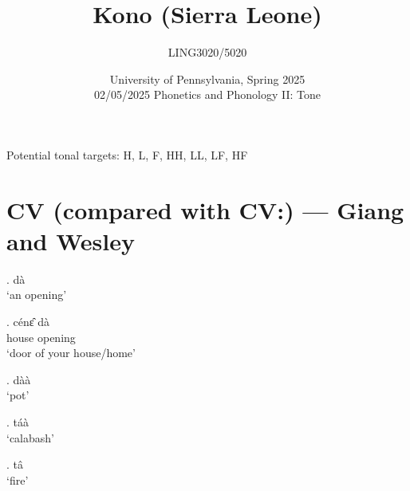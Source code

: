 \documentclass{assets/fieldnotes}
\title{Kono (Sierra Leone)}
\author{LING3020/5020}
\date{University of Pennsylvania, Spring 2025\\02/05/2025 Phonetics and Phonology II: Tone }
\begin{document}
\maketitle
\tableofcontents

\newpage

Potential tonal targets: H, L, F, HH, LL, LF, HF

\section{CV (compared with CV:) --- Giang and Wesley}






\ex. dà\\
`an opening' 

\exg. cénɛ̂ dà\\
house opening\\
`door of your house/home'\\

\ex. dàà\\
`pot'\\

\ex. táà\\
`calabash'\\

\ex. tâ\\
`fire'\\
\end{document}
